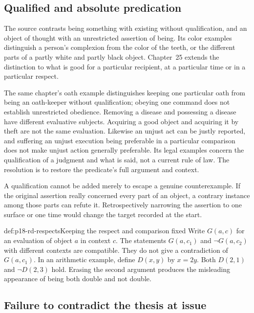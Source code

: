 \subsection{Qualified and absolute predication}

The source contrasts being something with existing without qualification,
and an object of thought with an unrestricted assertion of being.
Its color examples distinguish a person's complexion from the color
of the teeth, or the different parts of a partly white and partly black
object. Chapter~25 extends the distinction to what is good for a
particular recipient, at a particular time or in a particular respect.

The same chapter's oath example distinguishes keeping one particular
oath from being an oath-keeper without qualification; obeying one
command does not establish unrestricted obedience. Removing a disease
and possessing a disease have different evaluative subjects. Acquiring
a good object and acquiring it by theft are not the same evaluation.
Likewise an unjust act can be justly reported, and suffering an unjust
execution being preferable in a particular comparison does not make
unjust action generally preferable. Its legal examples concern the
qualification of a judgment and what is said, not a current rule of law.
The resolution is to restore the predicate's full argument and context.

A qualification cannot be added merely to escape a genuine
counterexample. If the original assertion really concerned every
part of an object, a contrary instance among those parts can refute
it. Retrospectively narrowing the assertion to one surface or one
time would change the target recorded at the start.

\begin{hbexample}{def:p18-rd-respects}{Keeping the respect and comparison fixed}
Write \(G(a,c)\) for an evaluation of object \(a\) in context
\(c\). The statements \(G(a,c_1)\) and \(\neg G(a,c_2)\)
with different contexts are compatible. They do not give a contradiction
of \(G(a,c_1)\). In an arithmetic example, define
\(D(x,y)\) by \(x=2y\). Both \(D(2,1)\) and
\(\neg D(2,3)\) hold. Erasing the second argument produces
the misleading appearance of being both double and not double.
\end{hbexample}

\subsection{Failure to contradict the thesis at issue}

